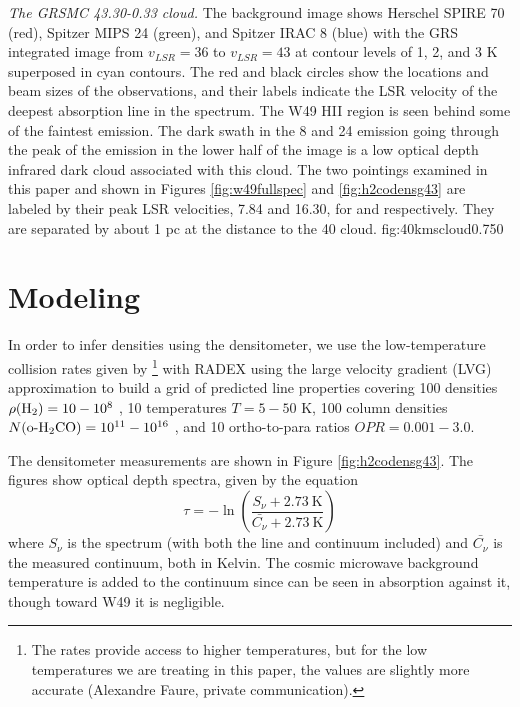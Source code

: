 {\textit{The GRSMC 43.30-0.33 cloud.}  The background image shows Herschel SPIRE 70 \um (red),
Spitzer MIPS 24 \um (green), and Spitzer IRAC 8 \um (blue) with
the GRS \thirteenco \citep{Jackson2006a} integrated image from $v_{LSR}=36$ \kms to $v_{LSR}=43$ \kms at contour levels of
1, 2, and 3 K \kms superposed in cyan contours.  The red and black circles
show the locations and beam sizes of the \formaldehyde observations, and their labels indicate the LSR velocity
of the deepest absorption line in the spectrum.  The W49 HII region is seen
behind some of the faintest \thirteenco emission.  The dark swath in the 8 and
24 \um emission going through the peak of the \thirteenco emission in the lower
half of the image is a low optical depth infrared dark cloud associated with
this cloud.  The two pointings examined in this paper and shown in Figures
\ref{fig:w49fullspec} and \ref{fig:h2codensg43} are labeled by their peak LSR
velocities, 7.84 and 16.30, for \north and \south respectively.  They are separated by
about 1 pc at the distance to the 40 \kms cloud.}
{fig:40kmscloud}{0.75}{0}

\section{Modeling \formaldehyde}
\label{sec:modeling}
In order to infer densities using the \formaldehyde densitometer, we use the
low-temperature collision rates given by \citet{Troscompt2009a}\footnote{The \citet{Wiesenfeld2013a}
rates provide access to higher temperatures, but for the low temperatures we are treating in this
paper, the \citet{Troscompt2009a} values are slightly more accurate (Alexandre Faure, private communication).}
with RADEX
using the large velocity gradient (LVG) approximation \citep{van-der-Tak2007a} to build a grid of
predicted line properties covering 100 densities $\rho(\textrm{H}_{2}) = 10-10^8$ \percc,
10 temperatures $T=5-50$ K, 100 column densities $N(\textrm{o-H}_2\textrm{CO}) = 10^{11}-10^{16}$
\persc, and 10 \hh ortho-to-para ratios $OPR = 0.001-3.0$.

The \formaldehyde densitometer measurements are shown in Figure \ref{fig:h2codensg43}.
The figures show optical depth spectra, given by the equation
\begin{equation}
    \tau = -\ln\left(\frac{S_\nu + 2.73\mathrm{~K}}{\bar{C_\nu} + 2.73\mathrm{~K}}\right)
\end{equation}
where $S_\nu$ is the spectrum (with both the line and continuum included) and $\bar{C_\nu}$ is
the measured continuum, both in Kelvin.  The cosmic microwave background
temperature is added to the continuum since \formaldehyde can be seen in
absorption against it, though toward W49 it is negligible.


